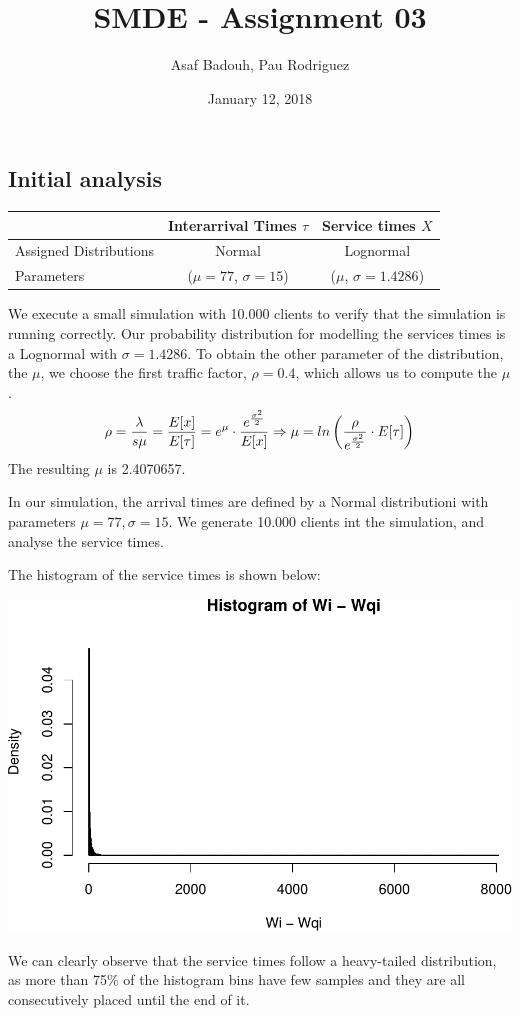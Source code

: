 \documentclass[]{article}
\title{SMDE - Assignment 03}
\author{Asaf Badouh, Pau Rodriguez}
\date{January 12, 2018}
\begin{document}
\maketitle

\subsection{Initial analysis}\label{initial-analysis}

\begin{longtable}[]{@{}lcc@{}}
\toprule
& Interarrival Times \(\tau\) & Service times \(X\)\tabularnewline
\midrule
\endhead
Assigned Distributions & Normal & Lognormal\tabularnewline
Parameters & (\(\mu=77\), \(\sigma=15\)) & (\(\mu\),
\(\sigma=1.4286\))\tabularnewline
\bottomrule
\end{longtable}

We execute a small simulation with 10.000 clients to verify that the
simulation is running correctly. Our probability distribution for
modelling the services times is a Lognormal with \(\sigma=1.4286\). To
obtain the other parameter of the distribution, the \(\mu\), we choose
the first traffic factor, \(\rho=0.4\), which allows us to compute the
\(\mu\).\\
\[  \rho = { \lambda \over {s\mu}} = { E[x] \over E[\tau] } = e^{\mu} \cdot { e^{\sigma^{2} \over 2} \over E[x] } \Rightarrow \mu = ln \left( { \rho \over e^{ \sigma^{2} \over 2 } } \cdot E[\tau]  \right) \]
The resulting \(\mu\) is 2.4070657.

In our simulation, the arrival times are defined by a Normal
distributioni with parameters \(\mu=77, \sigma=15\). We generate 10.000
clients int the simulation, and analyse the service times.

The histogram of the service times is shown below:

\begin{center}\includegraphics[width=0.5\linewidth]{003_files/figure-latex/unnamed-chunk-6-1} \end{center}

We can clearly observe that the service times follow a heavy-tailed
distribution, as more than 75\% of the histogram bins have few samples
and they are all consecutively placed until the end of it.
\end{document}
